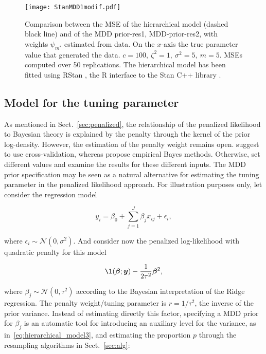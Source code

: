 \documentclass{statsoc}
\begin{document}
\begin{figure}
\centering
\texttt{[image: StanMDD1modif.pdf]}
\caption{Comparison between the MSE of the hierarchical model (dashed black line) and of the MDD prior-res1, MDD-prior-res2, with weights $\psi_{m^{*}}$ estimated from data. On the $x$-axis the true parameter value that generated the data. $c=100, \ \zeta^2=1,\  \sigma^2=5,\ m=5$. MSEs computed over 50 replications. The hierarchical model has been fitted using RStan \citep{rstan}, the R \citep{rcore} interface to
the Stan C++ library \citep{stan}.}
\label{hierarchical_comp}
\end{figure}


\subsection{Model for the tuning parameter}

As mentioned in Sect.~\ref{sec:penalized}, the relationship of the penalized likelihood to Bayesian theory is explained by the penalty through the kernel of the prior log-density. However, the estimation of the penalty weight remains open. \cite{hastie2002elements} suggest to use cross-validation, whereas \cite{efron2012large} propose empirical Bayes methods. Otherwise, \cite{cole2013maximum} set different values and examine the results for these different inputs. The MDD prior specification may be seen as a natural alternative for estimating the tuning parameter in the penalized likelihood approach. For illustration purposes only, let consider the regression model

$$y_{i}=\beta_{0}+\sum_{j=1}^{J}\beta_{j}x_{ij} +\epsilon_{i},$$

where $\epsilon_{i}\sim \mathcal{N}(0, \sigma^{2})$. And consider now the penalized log-likelihood with quadratic penalty for this model

\begin{equation}
\l(\bm{\beta}; \bm{y}) -\frac{1}{2\tau^{2}}\bm{\beta}^{2},
\label{eq:penalized_hierarchical}
\end{equation}

where $\beta_{j} \sim \mathcal{N}(0, \tau^{2})$ according to the Bayesian interpretation of the Ridge regression. The penalty weight/tuning parameter is $r=1/\tau^{2}$, the inverse of the prior variance. Instead of estimating directly this factor, specifying a MDD prior for $\beta_{j}$ is an automatic tool for introducing an auxiliary level for the variance, as in~\eqref{eq:hierarchical_model3}, and estimating the proportion $p$ through the resampling algorithms in Sect.~\ref{sec:alg}:
\end{document}

